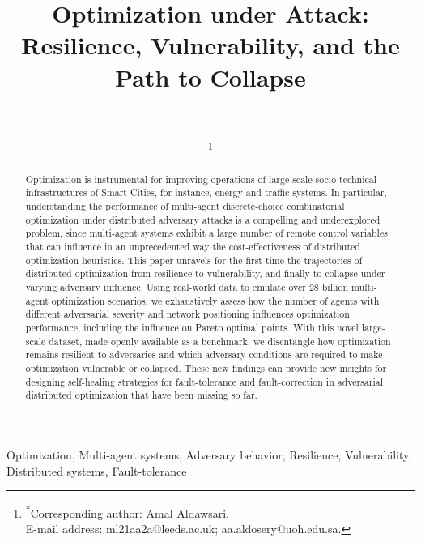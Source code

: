 \documentclass[journal]{IEEEtran}
\begin{document}
\title{Optimization under Attack: Resilience, Vulnerability, and the Path to Collapse}

\author{
     \\
     \\
    \thanks{\textsuperscript{*}Corresponding author: Amal Aldawsari. \\
    E-mail address: ml21aa2a@leeds.ac.uk; aa.aldosery@uoh.edu.sa.}
}
\maketitle

\begin{abstract}
Optimization is instrumental for improving operations of large-scale socio-technical infrastructures of Smart Cities, for instance, energy and traffic systems. In particular, understanding the performance of multi-agent discrete-choice combinatorial optimization under distributed adversary attacks is a compelling and underexplored problem, since multi-agent systems exhibit a large number of remote control variables that can influence in an unprecedented way the cost-effectiveness of distributed optimization heuristics. This paper unravels for the first time the trajectories of distributed optimization from resilience to vulnerability, and finally to collapse under varying adversary influence. Using real-world data to emulate over 28 billion multi-agent optimization scenarios, we exhaustively assess how the number of agents with different adversarial severity and network positioning influences optimization performance, including the influence on Pareto optimal points. With this novel large-scale dataset, made openly available as a benchmark, we disentangle how optimization remains resilient to adversaries and which adversary conditions are required to make optimization vulnerable or collapsed. These new findings can provide new insights for designing self-healing strategies for fault-tolerance and fault-correction in adversarial distributed optimization that have been missing so far. 
\end{abstract}

\begin{IEEEkeywords}
Optimization, Multi-agent systems, Adversary behavior, Resilience, Vulnerability, Distributed systems, Fault-tolerance
\end{IEEEkeywords}
\end{document}
